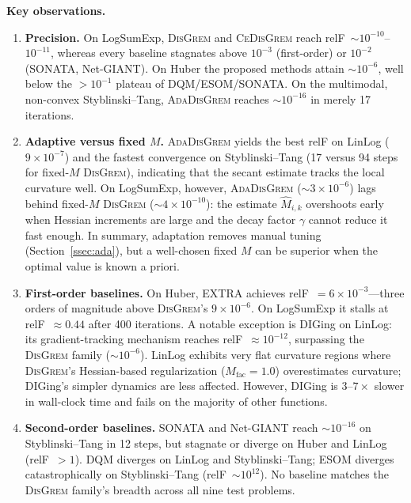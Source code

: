 \documentclass[11pt,a4paper]{article}
\begin{document}
	\noindent\textbf{Key observations.}
	\begin{enumerate}[leftmargin=1.4em,itemsep=2pt]
		\item \textbf{Precision.}
		On LogSumExp, \textsc{DisGrem} and \textsc{CeDisGrem} reach
		relF~$\sim10^{-10}$--$10^{-11}$, whereas every baseline
		stagnates above $10^{-3}$ (first-order) or $10^{-2}$
		(SONATA, Net-GIANT).
		On Huber the proposed methods attain $\sim10^{-6}$, well
		below the $>10^{-1}$ plateau of DQM/ESOM/SONATA.
		On the multimodal, non-convex Styblinski--Tang,
		\textsc{AdaDisGrem} reaches $\sim10^{-16}$ in merely 17
		iterations.
		
		\item \textbf{Adaptive versus fixed $M$.}
		\textsc{AdaDisGrem} yields the best relF on LinLog
		($9{\times}10^{-7}$) and the fastest convergence on
		Styblinski--Tang (17 versus 94 steps for fixed-$M$
		\textsc{DisGrem}), indicating that the secant estimate
		tracks the local curvature well.
		On LogSumExp, however, \textsc{AdaDisGrem}
		($\sim3{\times}10^{-6}$) lags behind fixed-$M$
		\textsc{DisGrem} ($\sim4{\times}10^{-10}$):
		the estimate $\hat M_{i,k}$ overshoots early when Hessian
		increments are large and the decay factor $\gamma$ cannot
		reduce it fast enough.
		In summary, adaptation removes manual tuning
		(Section~\ref{ssec:ada}), but a well-chosen fixed $M$ can
		be superior when the optimal value is known a priori.
		
		\item \textbf{First-order baselines.}
		On Huber, EXTRA achieves relF~$=6{\times}10^{-3}$---three
		orders of magnitude above \textsc{DisGrem}'s
		$9{\times}10^{-6}$.
		On LogSumExp it stalls at relF~$\approx0.44$ after 400
		iterations.
		A notable exception is DIGing on LinLog: its gradient-tracking
		mechanism reaches relF~$\approx10^{-12}$, surpassing the
		\textsc{DisGrem} family ($\sim10^{-6}$).
		LinLog exhibits very flat curvature regions where
		\textsc{DisGrem}'s Hessian-based regularization
		($M_{\mathrm{fac}}{=}1.0$) overestimates curvature;
		DIGing's simpler dynamics are less affected.
		However, DIGing is $3$--$7\times$ slower in wall-clock time
		and fails on the majority of other functions.
		
		\item \textbf{Second-order baselines.}
		SONATA and Net-GIANT reach $\sim10^{-16}$ on
		Styblinski--Tang in 12 steps, but stagnate or diverge on
		Huber and LinLog (relF~$>1$).
		DQM diverges on LinLog and Styblinski--Tang; ESOM diverges
		catastrophically on Styblinski--Tang (relF~$\sim10^{12}$).
		No baseline matches the \textsc{DisGrem} family's breadth
		across all nine test problems.
		

\end{enumerate}
\end{document}
